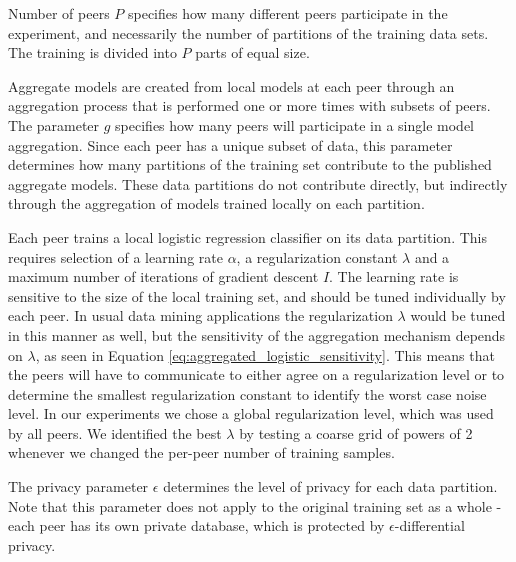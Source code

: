 Number of peers $P$ specifies how many different peers participate in the experiment, and necessarily the number of partitions of the training data sets. The training is divided into $P$ parts of equal size.

Aggregate models are created from local models at each peer through an aggregation process that is performed one or more times with subsets of peers. The parameter $g$ specifies how many peers will participate in a single model aggregation. Since each peer has a unique subset of data, this parameter determines how many partitions of the training set contribute to the published aggregate models. These data partitions do not contribute directly, but indirectly through the aggregation of models trained locally on each partition.

Each peer trains a local logistic regression classifier on its data partition. This requires selection of a learning rate $\alpha$, a regularization constant $\lambda$ and a maximum number of iterations of gradient descent $I$. The learning rate is sensitive to the size of the local training set\cite{wilson20013learningrate}, and should be tuned individually by each peer. In usual data mining applications the regularization $\lambda$ would be tuned in this manner as well, but the sensitivity of the aggregation mechanism depends on $\lambda$, as seen in Equation \ref{eq:aggregated_logistic_sensitivity}. This means that the peers will have to communicate to either agree on a regularization level or to determine the smallest regularization constant to identify the worst case noise level. In our experiments we chose a global regularization level, which was used by all peers. We identified the best $\lambda$ by testing a coarse grid of powers of 2 whenever we changed the per-peer number of training samples. 


The privacy parameter $\epsilon$ determines the level of privacy for each data partition. Note that this parameter does not apply to the original training set as a whole - each peer has its own private database, which is protected by $\epsilon$-differential privacy. 

